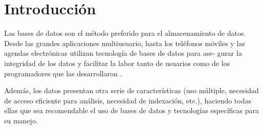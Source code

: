 \section{Introducción}

Las bases de datos son el método preferido para el almacenamiento de datos. Desde las grandes aplicaciones multiusuario, hasta los teléfonos
móviles y las agendas electrónicas utilizan tecnología de bases de datos para ase-
gurar la integridad de los datos y facilitar la labor tanto de usuarios como de los
programadores que las desarrollaron \cite{ref1}. 

Además, los datos presentan otra serie de características (uso múltiple, necesidad de acceso eficiente para análisis, necesidad de indexación, etc.), haciendo todas ellas que sea recomendable el uso de bases de datos y tecnologías específicas para su manejo.